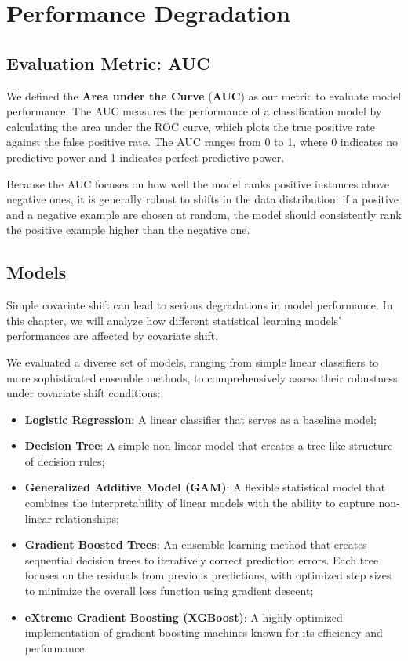 \chapter{Performance Degradation}

\section{Evaluation Metric: AUC}

We defined the \textbf{Area under the Curve} (\textbf{AUC}) as our metric to evaluate model performance. The AUC measures the performance of a classification model by calculating the area under the ROC curve, which plots the true positive rate against the false positive rate. The AUC ranges from 0 to 1, where 0 indicates no predictive power and 1 indicates perfect predictive power.

Because the AUC focuses on how well the model ranks positive instances above negative ones, it is generally robust to shifts in the data distribution: if a positive and a negative example are chosen at random, the model should consistently rank the positive example higher than the negative one. 

\section{Models}

Simple covariate shift can lead to serious degradations in model performance. In this chapter, we will analyze how different statistical learning models' performances are affected by covariate shift. 

We evaluated a diverse set of models, ranging from simple linear classifiers to more sophisticated ensemble methods, to comprehensively assess their robustness under covariate shift conditions:

\begin{itemize}
    \item \textbf{Logistic Regression}: A linear classifier that serves as a baseline model;
    \item \textbf{Decision Tree}: A simple non-linear model that creates a tree-like structure of decision rules;
    \item \textbf{Generalized Additive Model (GAM)}: A flexible statistical model that combines the interpretability of linear models with the ability to capture non-linear relationships;
    \item \textbf{Gradient Boosted Trees}: An ensemble learning method that creates sequential decision trees to iteratively correct prediction errors. Each tree focuses on the residuals from previous predictions, with optimized step sizes to minimize the overall loss function using gradient descent;
    \item \textbf{eXtreme Gradient Boosting (XGBoost)}: A highly optimized implementation of gradient boosting machines known for its efficiency and performance.
\end{itemize}

